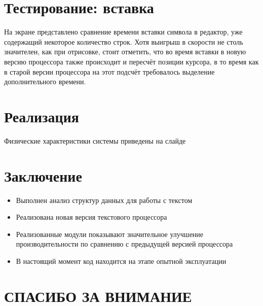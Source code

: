 \documentclass{article}
\begin{document}
    \section{Тестирование: вставка}
        \par На экране представлено сравнение времени вставки символа в редактор, уже 
        содержащий некоторое количество строк. Хотя выигрыш в скорости не столь значителен, как
        при отрисовке, стоит отметить, что во время вставки в новую версию процессора также
        происходит и пересчёт позиции курсора, в то время как в старой версии процессора на 
        этот подсчёт требовалось выделение дополнительного времени.
    \section{Реализация}
        \par Физические характеристики системы приведены на слайде
    \section{Заключение}
        \begin{itemize}
            \item Выполнен анализ структур данных для работы с текстом
            \item Реализована новая версия текстового процессора
            \item Реализованные модули показывают значительное улучшение производительности по 
            сравнению с предыдущей версией процессора
            \item В настоящий момент код находится на этапе опытной эксплуатации
        \end{itemize}
    \section{СПАСИБО ЗА ВНИМАНИЕ}
\end{document}
